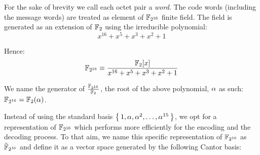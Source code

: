 For the sake of brevity we call each octet pair a \emph{word}. The code words (including the message words) are treated as element of $\mathbb{F}_{2^{16}}$ finite field. The field is generated as an extension of $\mathbb{F}_2$ using the irreducible polynomial:
\begin{equation}
x^{16} + x^5 + x^3 + x^2 + 1
\end{equation}

Hence:
\begin{equation}
\finitefield_{2^{16}} \equiv \frac{\finitefield_2\subb{x}}{x^{16} + x^5 + x^3 + x^2 + 1}
\end{equation}

We name the generator of $\frac{\mathbb{F}_{2^{16}}}{\mathbb{F}_2}$, the root of the above polynomial, $\alpha$ as such: $\mathbb{F}_{2^{16}} = \mathbb{F}_2(\alpha)$.

Instead of using the standard basis $\set{1, \authpool, \authpool^2, \dots, \authpool^{15}}$, we opt for a representation of $\mathbb{F}_{2^{16}}$ which performs more efficiently for the encoding and the decoding process. To that aim, we name this specific representation of $\mathbb{F}_{2^{16}}$ as $\tilde{\mathbb{F}}_{2^{16}}$ and define it as a vector space generated by the following Cantor basis:

